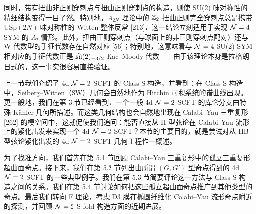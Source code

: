 

同时，带有扭曲非正则穿刺点与扭曲正则穿刺点的构造，则使 SU(2) 味对称性的精细结构变得一目了然。特别地，$A_{2N}$ 理论中的 $\mathbb{Z}_2$ 扭曲正则完全穿刺点总是携带 $\mathrm{USp}(2N)$ 味对称性的 Witten 整体反常 [213]，这一结论立刻适用于实现 $\mathcal{N}=4$ SYM 的 $A_2$ 情形。此外，扭曲正则穿刺点（与球面上的非正则穿刺点配对）还与 W-代数型的手征代数存在自然对应 [56]；特别地，这意味着与 $\mathcal{N}=4$ SU(2) SYM 相对应的手征代数正是 $\widehat{\mathfrak{su}}(2)_{-3/2}$ Kac--Moody 代数——由于该理论本身是拉格朗日式的，这一事实很容易直接验证。


上一节我们介绍了 4d $\mathcal{N}=2$ SCFT 的 Class S 构造，并看到：在 Class S 构造中，Seiberg--Witten（SW）几何会自然地作为 Hitchin 可积系统的谱曲线出现。更一般地，我们在第 3 节已经看到，一个一般 4d $\mathcal{N}=2$ SCFT 的库仑分支由特殊 Kähler 几何所描述。而这类几何结构也会自然地出现在 Calabi--Yau 三重复形 [262] 的模空间中，这就促使我们追问：能否直接从 II 型弦论在 Calabi--Yau 流形上的紧化出发来实现一个 4d $\mathcal{N}=2$ SCFT？本节的主要目的，就是尝试对从 IIB 型弦论紧化出发的 4d $\mathcal{N}=2$ SCFT 几何工程作一概述。

为了找准方向，我们首先在第 5.1 节回顾 Calabi--Yau 三重复形中的孤立三重复形超曲面奇点。接下来，我们在第 5.2 节列出由所谓 $(G,G')$ 型奇点得到的 4d $\mathcal{N}=2$ SCFT 的一些典型例子。我们在第 5.3 节简要评论这一方法与 Class S 构造之间的关系。我们在第 5.4 节讨论如何把这些孤立超曲面奇点推广到其他类型的奇点。最后我们转向 F 理论，考虑 D3 膜在椭圆纤维化 Calabi--Yau 流形奇点附近的探测，并回顾 $\mathcal{N}=2$ S-fold 构造方面的近期进展。


